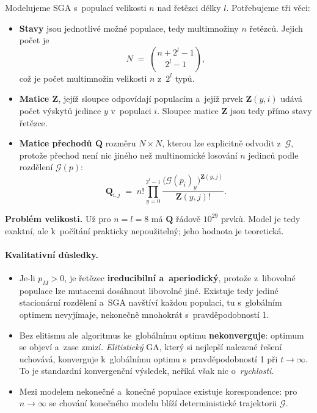 \documentclass[11pt,a4paper]{article}
\theoremstyle{definition}
\begin{document}
Modelujeme SGA s~populací velikosti $n$ nad řetězci délky $l$. Potřebujeme tři věci:
\begin{itemize}
\item \textbf{Stavy} jsou jednotlivé možné populace, tedy multimnožiny $n$ řetězců.
  Jejich počet je
  \[
  N \;=\; \binom{n + 2^l - 1}{\,2^l - 1\,},
  \]
  což je počet multimnožin velikosti $n$ z~$2^l$ typů.
\item \textbf{Matice $\mathbf{Z}$}, jejíž sloupce odpovídají populacím a~jejíž prvek
  $\mathbf{Z}(y,i)$ udává počet výskytů jedince $y$ v~populaci $i$. Sloupce
  matice $\mathbf{Z}$ jsou tedy přímo stavy řetězce.
\item \textbf{Matice přechodů $\mathbf{Q}$} rozměru $N \times N$, kterou lze
  explicitně odvodit z~$\mathcal{G}$, protože přechod není nic jiného než
  multinomické losování $n$ jedinců podle rozdělení $\mathcal{G}(p)$:
  \[
  \mathbf{Q}_{i,j} \;=\; n! \prod_{y=0}^{2^l-1}
  \frac{\big(\mathcal{G}(p_i)_y\big)^{\mathbf{Z}(y,j)}}{\mathbf{Z}(y,j)!}.
  \]
\end{itemize}

\textbf{Problém velikosti.} Už pro $n = l = 8$ má $\mathbf{Q}$ řádově
$10^{29}$ prvků. Model je tedy exaktní, ale k~počítání prakticky nepoužitelný;
jeho hodnota je teoretická.

\paragraph{Kvalitativní důsledky.}
\begin{itemize}
\item Je-li $p_M > 0$, je řetězec \textbf{ireducibilní a~aperiodický}, protože
  z~libovolné populace lze mutacemi dosáhnout libovolné jiné. Existuje tedy
  jediné stacionární rozdělení a~SGA navštíví každou populaci, tu s~globálním
  optimem nevyjímaje, nekonečně mnohokrát s~pravděpodobností 1.
\item Bez elitismu ale algoritmus ke~globálnímu optimu \textbf{nekonverguje}:
  optimum se objeví a~zase zmizí. \emph{Elitistický} GA, který si nejlepší nalezené
  řešení uchovává, konverguje k~globálnímu optimu s~pravděpodobností 1 při
  $t \to \infty$. To je standardní konvergenční výsledek, neříká však nic
  o~\emph{rychlosti}.
\item Mezi modelem nekonečné a~konečné populace existuje korespondence:
  pro $n \to \infty$ se chování konečného modelu blíží deterministické
  trajektorii $\mathcal{G}$.
\end{itemize}
\end{document}
